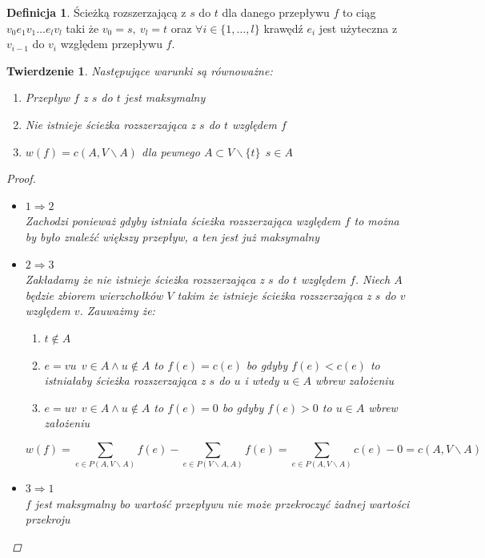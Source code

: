 \documentclass[12pt,a4paper]{article}
\newtheorem{tw}{Twierdzenie}
\theoremstyle{definition}
\newtheorem{df}{Definicja}
\begin{document}
\begin{df} 
Ścieżką rozszerzającą z $s$ do $t$ dla danego przepływu $f$ to ciąg $v_0e_1v_1\dots e_lv_l$ taki że $v_0 = s, ~ v_l=t$ oraz $\forall i\in \{1,\dots , l\}$ krawędź $e_i$ jest użyteczna z $v_{i-1}$ do $v_i$ względem przepływu $f$.
\end{df}



\begin{tw}
Następujące warunki są równoważne:
\begin{enumerate}
	\item Przepływ $f$ z $s$ do $t$ jest maksymalny
	\item Nie istnieje ścieżka rozszerzająca z $s$ do $t$ względem $f$
	\item $w(f) = c(A, V \smallsetminus A)$ dla pewnego $A\subset V\smallsetminus \{t\}~~s\in A$
\end{enumerate}
\begin{proof}
\begin{itemize}
	\item $1\Rightarrow 2$\\
	Zachodzi ponieważ gdyby istniała ścieżka rozszerzająca względem $f$ to można by było znaleźć większy przepływ, a ten jest już maksymalny
	\item $2\Rightarrow 3$\\
	Zakładamy że nie istnieje ścieżka rozszerzająca z $s$ do $t$ względem $f$. Niech $A$ będzie zbiorem wierzchołków $V$ takim że istnieje ścieżka rozszerzająca z $s$ do $v$ względem $v$. Zauważmy że:
	\begin{enumerate}
		\item $t\not\in A$
		\item $e = vu ~~ v\in A \wedge u\not\in A$ to $f(e) = c(e)$ bo gdyby $f(e) <c(e)$ to istniałaby ścieżka rozszerzająca z $s$ do $u$ i wtedy $u\in A$ wbrew założeniu
		\item $e = uv ~~ v\in A \wedge u\not\in A$ to $f(e) = 0$ bo gdyby $f(e) > 0 $ to $u\in A$ wbrew założeniu
	\end{enumerate}
	$$w(f) = \sum\limits_{e\in P(A, V\smallsetminus A)}f(e) - \sum\limits_{e\in P(V \smallsetminus A, A)}f(e) = \sum\limits_{e\in P(A, V\smallsetminus A)}c(e) - 0 = c(A, V\smallsetminus A)$$
	\item $3 \Rightarrow 1$\\
	$f$ jest maksymalny bo wartość przepływu nie może przekroczyć żadnej wartości przekroju
\end{itemize}
\end{proof}
\end{tw}

\end{document}
